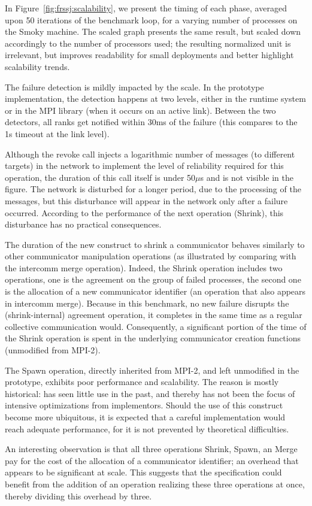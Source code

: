 In Figure~\ref{fig:frssj:scalability}, we present the timing of each phase,
averaged upon 50 iterations of the benchmark loop, for a varying number of
processes on the Smoky machine. 
The scaled graph presents the same result, but scaled down accordingly
 to the number of processors used; the resulting normalized unit is 
irrelevant, but improves readability for small deployments and  
better highlight scalability trends. 

The failure detection is mildly impacted by the scale. In the prototype
implementation, the detection happens at two levels, either in the
runtime system or in the MPI library (when it occurs on an active link).
Between the two detectors, all ranks get notified within 30ms of the
failure (this compares to the 1s timeout at the link level).

Although the revoke call injects a logarithmic number of messages (to
different targets) in the network to implement the level of reliability
required for this operation, the duration of this call itself is under
50$\mu$s and is not visible in the figure. The network is disturbed for
a longer period, due to the processing of the messages, but this
disturbance will appear in the network only after a failure occurred.
According to the performance of the next operation (Shrink), this
disturbance has no practical consequences.

The duration of the new construct to shrink a communicator behaves
similarly to other communicator manipulation operations (as illustrated
by comparing with the intercomm merge operation). Indeed, the Shrink
operation includes two operations, one is the agreement on the group of
failed processes, the second one is the allocation of a new communicator
identifier (an operation that also appears in intercomm merge). Because
in this benchmark, no new failure disrupts the (shrink-internal)
agreement operation, it completes in the same time as a regular
collective communication would. Consequently, a significant portion of
the time of the Shrink operation is spent in the underlying communicator
creation functions (unmodified from MPI-2).

The Spawn operation, directly inherited from MPI-2, and left unmodified
in the \ulfm prototype, exhibits poor performance and scalability. The
reason is mostly historical:  has seen little
use in the past, and thereby has not been the focus of intensive
optimizations from implementors. Should the use of this construct become
more ubiquitous, it is expected that a careful implementation would
reach adequate performance, for it is not prevented by theoretical
difficulties.

An interesting observation is that all three operations Shrink, Spawn,
an Merge pay for the cost of the allocation of a communicator
identifier; an overhead that appears to be significant at scale. This
suggests that the \ulfm specification could benefit from the addition of
an operation realizing these three operations at once, thereby dividing
this overhead by three.
